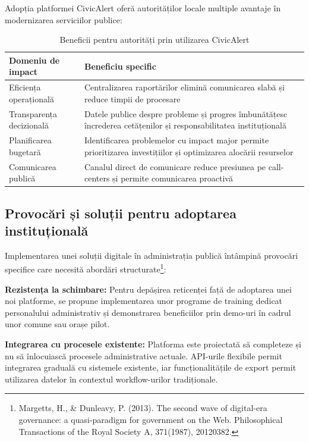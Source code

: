 \documentclass[12pt,a4paper]{report}
\begin{document}
Adopția platformei CivicAlert oferă autorităților locale multiple avantaje în modernizarea serviciilor publice:

\begin{table}[H]
\centering
\caption{Beneficii pentru autorități prin utilizarea CivicAlert}
\label{tab:beneficii_autoritati}
\begin{tabular}{|p{5cm}|p{8cm}|}
\hline
\textbf{Domeniu de impact} & \textbf{Beneficiu specific} \\
\hline
Eficiența operațională & Centralizarea raportărilor elimină comunicarea slabă și reduce timpii de procesare  \\
\hline
Transparența decizională & Datele publice despre probleme și progres îmbunătățesc încrederea cetățenilor și responsabilitatea instituțională \\
\hline
Planificarea bugetară & Identificarea problemelor cu impact major permite prioritizarea investițiilor și optimizarea alocării resurselor \\
\hline
Comunicarea publică & Canalul direct de comunicare reduce presiunea pe call-centers și permite comunicarea proactivă \\
\hline
\end{tabular}
\end{table}

\subsection{Provocări și soluții pentru adoptarea instituțională}

Implementarea unei soluții digitale în administrația publică întâmpină provocări specifice care necesită abordări structurate\footnote{Margetts, H., \& Dunleavy, P. (2013). The second wave of digital-era governance: a quasi-paradigm for government on the Web. Philosophical Transactions of the Royal Society A, 371(1987), 20120382.}:

\textbf{Rezistența la schimbare:} Pentru depășirea reticenței față de adoptarea unei noi platforme, se propune implementarea unor programe de training dedicat personalului administrativ și demonstrarea beneficiilor prin demo-uri în cadrul unor comune sau orașe pilot.

\textbf{Integrarea cu procesele existente:} Platforma este proiectată să completeze și nu să înlocuiască procesele administrative actuale. API-urile flexibile permit integrarea graduală cu sistemele existente, iar funcționalitățile de export permit utilizarea datelor în contextul workflow-urilor tradiționale.
\end{document}
